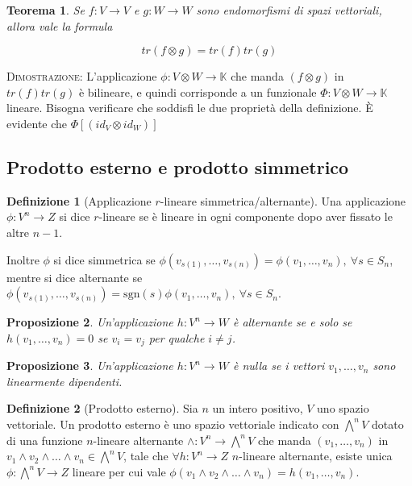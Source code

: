 \documentclass[11pt]{article}
\theoremstyle{plain}
\newtheorem{thm}{Teorema}[section]
\newtheorem{prop}[thm]{Proposizione}
\theoremstyle{definition}
\newtheorem{defn}{Definizione}[section]
\theoremstyle{remark}
\newcommand{\K}{\mathbb{K}}
\begin{document}
\begin{thm}
Se $f:V\to V$ e $g:W\to W$ sono endomorfismi di spazi vettoriali, allora vale la formula

\[tr(f\otimes g) = tr(f) tr(g)  \]

\end{thm}

\textsc{Dimostrazione:} L'applicazione $\phi: V \otimes W \to \K$ che manda $(f\otimes g)$ in $tr(f) tr(g)$ è bilineare, e quindi corrisponde a un funzionale $\Phi: V \otimes W \to \K$ lineare. Bisogna verificare che soddisfi le due proprietà della definizione.  È evidente che $\Phi[ (id_V \otimes id_W)  ]  $ 


\subsection{Prodotto esterno e prodotto simmetrico}

\begin{defn}[Applicazione $r$-lineare simmetrica/alternante]
 Una applicazione $\phi: V^n \to Z$ si dice $r$-lineare se è lineare in ogni componente dopo aver fissato le altre $n-1$.

 Inoltre $\phi$ si dice simmetrica se $\phi(v_{s(1)},\ldots,v_{s(n)})=\phi(v_1,\ldots,v_n),\ \forall s \in S_n$, mentre si dice 
 alternante se $\phi(v_{s(1)},\ldots,v_{s(n)})=\mathrm{sgn}(s)\phi(v_1,\ldots,v_n),\ \forall s \in S_n$.
 
\end{defn}

\begin{prop}
 Un'applicazione $h: V^n \to W$ è alternante se e solo se $h(v_1,\ldots,v_n)=0$ se $v_i=v_j$ per qualche $i\neq j$.
 \end{prop}

 \begin{prop}
  Un'applicazione $h: V^n \to W$ è nulla se i vettori $v_1,\ldots,v_n$ sono linearmente dipendenti.
 \end{prop}

\begin{defn}[Prodotto esterno]
Sia $n$ un intero positivo, $V$ uno spazio vettoriale. Un prodotto esterno è uno spazio vettoriale indicato con $\bigwedge^n V$
dotato di una funzione $n$-lineare alternante $\wedge: V^n \to \bigwedge^n V$ che manda $(v_1,\ldots,v_n)$ in 
$v_1\wedge v_2\wedge\ldots\wedge v_n \in \bigwedge^n V$, tale che $\forall h: V^n \to Z$ $n$-lineare alternante, 
esiste unica $\phi: \bigwedge^n V \to Z $ lineare per cui vale $\phi(v_1\wedge v_2\wedge \ldots \wedge v_n)=h(v_1,\ldots,v_n)$.

\label{defn:prodotto esterno}
\end{defn}
\end{document}
